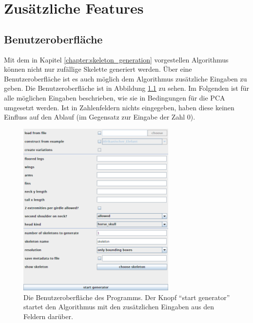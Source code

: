 \chapter{Zusätzliche Features}
\label{chapter:additional_features}


\section{Benutzeroberfläche}
\label{gui}

Mit dem in Kapitel \ref{chapter:skeleton_generation} vorgestellen Algorithmus können nicht nur zufällige Skelette generiert werden. Über eine Benutzeroberfläche ist es auch möglich dem Algorithmus zusätzliche Eingaben zu geben. Die Benutzeroberfläche ist in Abbildung \ref{gui_screenshot} zu sehen.
Im Folgenden ist für alle möglichen Eingaben beschrieben, wie sie in Bedingungen für die PCA umgesetzt werden. Ist in Zahlenfeldern nichts eingegeben, haben diese keinen Einfluss auf den Ablauf (im Gegensatz zur Eingabe der Zahl $0$).

\begin{figure}[ht]
 \centering
 \includegraphics[width=0.7\textwidth]{graphics/gui.png}
 \caption{Die Benutzeroberfläche des Programms. Der Knopf "`start generator"' startet den Algorithmus mit den zusätzlichen Eingaben aus den Feldern darüber.}
 \label{gui_screenshot}
\end{figure}

